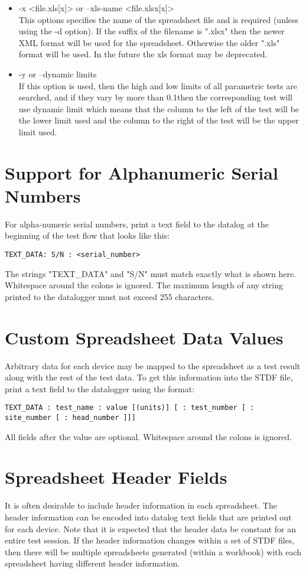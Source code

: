 \documentclass[letterpaper]{article}
\begin{document}
\begin{itemize}
\item -x <file.xls[x]> or --xls-name <file.xlsx[x]>\\
This options specifies the name of the spreadsheet file and is required (unless using the -d option).
If the suffix of the filename is ".xlsx" then the newer XML format will be used for the spreadsheet.
Otherwise the older ".xls" format will be used.  In the future the xls format may be deprecated.
\item -y or --dynamic limits\\
If this option is used, then the high and low limits of all parametric tests are
searched, and if they vary by more than 0.1\percent then the corresponding test will use dynamic limit
which means that the column to the left of the test will be the lower limit used and the column to
the right of the test will be the upper limit used.
\end{itemize}
\clearpage
\section{Support for Alphanumeric Serial Numbers}
For alpha-numeric serial numbers, print a text field to the datalog
at the beginning of the test flow that looks like this:

\begin{verbatim}
TEXT_DATA: S/N : <serial_number>
\end{verbatim}
The strings "TEXT\_DATA" and "S/N" must match exactly what is shown here.  Whitespace
around the colons is ignored.  The maximum length of any string printed to the datalogger
must not exceed 255 characters.

\section{Custom Spreadsheet Data Values}
Arbitrary data for each device may be mapped to the spreadsheet as a test result along
with the rest of the test data.  To get this information into the STDF file, print a 
text field to the datalogger using the format:
\begin{verbatim}
TEXT_DATA : test_name : value [(units)] [ : test_number [ : site_number [ : head_number ]]]
\end{verbatim}
All fields after the value are optional.  Whitespace around the colons is ignored.

\section{Spreadsheet Header Fields}
It is often desirable to include header information in each spreadsheet.  The header information
can be encoded into datalog text fields that are printed out for each device.  Note that it is
expected that the header data be constant for an entire test session.  If the header information
changes within a set of STDF files, then there will be multiple spreadsheets generated (within a workbook)
with each spreadsheet having different header information.
\end{document}

